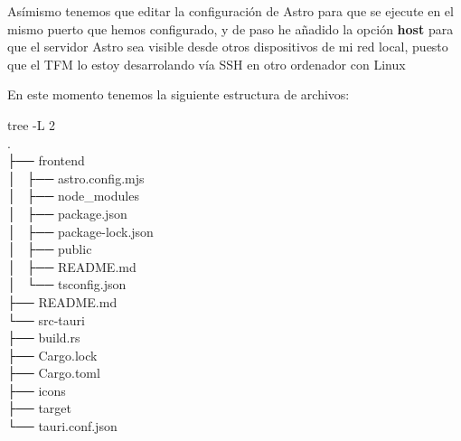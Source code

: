 \newpage
Asímismo tenemos que editar la configuración de Astro para que se ejecute en el mismo puerto que hemos configurado, y de paso he añadido la opción \textbf{host} para que el servidor Astro sea visible desde otros dispositivos de mi red local, puesto que el TFM lo estoy desarrolando vía SSH en otro ordenador con Linux

En este momento tenemos la siguiente estructura de archivos:
\begin{multicli}
    \cliarrow tree -L 2 \\
    . \\
    ├── frontend \\
    │   ├── astro.config.mjs \\
    │   ├── node\_modules \\
    │   ├── package.json \\
    │   ├── package-lock.json \\
    │   ├── public \\
    │   ├── README.md \\
    │   └── tsconfig.json \\
    ├── README.md \\
    └── src-tauri \\
    \hphantom{0.1cm}├── build.rs \\
    \hphantom{0.1cm}├── Cargo.lock \\
    \hphantom{0.1cm}├── Cargo.toml \\
    \hphantom{0.1cm}├── icons \\
    \hphantom{0.1cm}├── target \\
    \hphantom{0.1cm}└── tauri.conf.json
\end{multicli}
